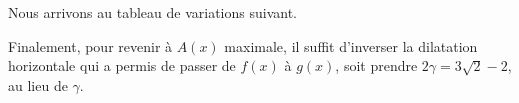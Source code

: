 Nous arrivons au tableau de variations suivant.

\begin{center}
\end{center}

Finalement,
pour revenir à $A(x)$ maximale, il suffit d'inverser la dilatation horizontale qui a permis de passer de $f(x)$ à $g(x)$, soit prendre $2 \gamma = 3 \sqrt{2} - 2$, au lieu de $\gamma$.

